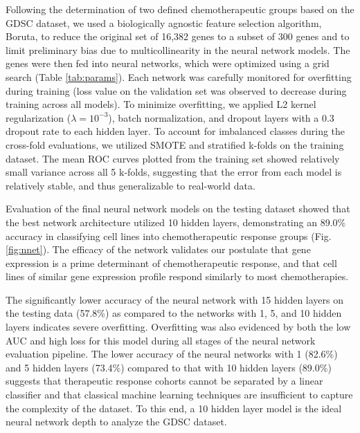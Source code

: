 \documentclass[10pt, letterpaper, twocolumn]{article}
\begin{document}
Following the determination of two defined chemotherapeutic groups based on the GDSC dataset, we used a biologically agnostic feature selection algorithm, Boruta, to reduce the original set of 16,382 genes to a subset of 300 genes and to limit preliminary bias due to multicollinearity in the neural network models. The genes were then fed into neural networks, which were optimized using a grid search (Table \ref{tab:params}). Each network was carefully monitored for overfitting during training (loss value on the validation set was observed to decrease during training across all models). To minimize overfitting, we applied L2 kernel regularization ($\lambda=10^{-3}$), batch normalization, and dropout layers with a 0.3 dropout rate to each hidden layer. To account for imbalanced classes during the cross-fold evaluations, we utilized SMOTE and stratified k-folds on the training dataset. The mean ROC curves plotted from the training set showed relatively small variance across all 5 k-folds, suggesting that the error from each model is relatively stable, and thus generalizable to real-world data.

Evaluation of the final neural network models on the testing dataset showed that the best network architecture utilized 10 hidden layers, demonstrating an 89.0\% accuracy in classifying cell lines into chemotherapeutic response groups (Fig. \ref{fig:nnet}). The efficacy of the network validates our postulate that gene expression is a prime determinant of chemotherapeutic response, and that cell lines of similar gene expression profile respond similarly to most chemotherapies.

The significantly lower accuracy of the neural network with 15 hidden layers on the testing data (57.8\%) as compared to the networks with 1, 5, and 10 hidden layers indicates severe overfitting. Overfitting was also evidenced by both the low AUC and high loss for this model during all stages of the neural network evaluation pipeline. The lower accuracy of the neural networks with 1 (82.6\%) and 5 hidden layers (73.4\%) compared to that with 10 hidden layers (89.0\%) suggests that therapeutic response cohorts cannot be separated by a linear classifier and that classical machine learning techniques are insufficient to capture the complexity of the dataset. To this end, a 10 hidden layer model is the ideal neural network depth to analyze the GDSC dataset.
\end{document}
